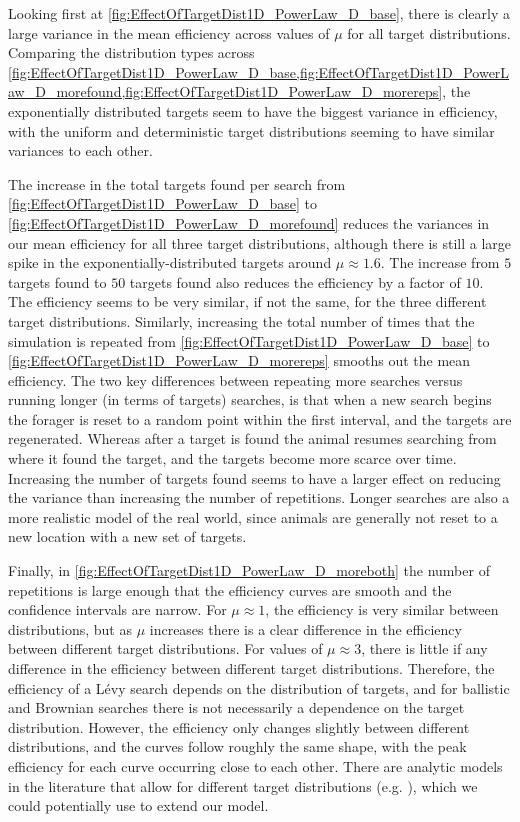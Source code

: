 Looking first at \cref{fig:EffectOfTargetDist1D_PowerLaw_D_base}, there is clearly a large variance in the mean efficiency across values of $\mu$ for all target distributions. Comparing the distribution types across \cref{fig:EffectOfTargetDist1D_PowerLaw_D_base,fig:EffectOfTargetDist1D_PowerLaw_D_morefound,fig:EffectOfTargetDist1D_PowerLaw_D_morereps}, the exponentially distributed targets seem to have the biggest variance in efficiency, with the uniform and deterministic target distributions seeming to have similar variances to each other. 

The increase in the total targets found per search from \cref{fig:EffectOfTargetDist1D_PowerLaw_D_base} to \cref{fig:EffectOfTargetDist1D_PowerLaw_D_morefound} reduces the variances in our mean efficiency for all three target distributions, although there is still a large spike in the exponentially-distributed targets around $\mu\approx 1.6$. The increase from $5$ targets found to $50$ targets found also reduces the efficiency by a factor of $10$. The efficiency seems to be very similar, if not the same, for the three different target distributions. Similarly, increasing the total number of times that the simulation is repeated from \cref{fig:EffectOfTargetDist1D_PowerLaw_D_base} to \cref{fig:EffectOfTargetDist1D_PowerLaw_D_morereps} smooths out the mean efficiency. The two key differences between repeating more searches versus running longer (in terms of targets) searches, is that when a new search begins the forager is reset to a random point within the first interval, and the targets are regenerated. Whereas after a target is found the animal resumes searching from where it found the target, and the targets become more scarce over time. Increasing the number of targets found seems to have a larger effect on reducing the variance than increasing the number of repetitions. Longer searches are also a more realistic model of the real world, since animals are generally not reset to a new location with a new set of targets.


Finally, in \cref{fig:EffectOfTargetDist1D_PowerLaw_D_moreboth} the number of repetitions is large enough that the efficiency curves are smooth and the confidence intervals are narrow. For $\mu \approx 1$, the efficiency is very similar between distributions, but as $\mu$ increases there is a clear difference in the efficiency between different target distributions. For values of $\mu \approx 3$, there is little if any difference in the efficiency between different target distributions. Therefore, the efficiency of a L\'{e}vy search depends on the distribution of targets, and for ballistic and Brownian searches there is not necessarily a dependence on the target distribution. However, the efficiency only changes slightly between different distributions, and the curves follow roughly the same shape, with the peak efficiency for each curve occurring close to each other. There are analytic models in the literature that allow for different target distributions (e.g. \cite{Bartumeus_2013}), which we could potentially use to extend our model. 

